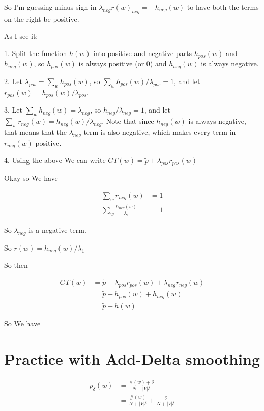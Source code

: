 \documentclass{article}
\begin{document}
		So I'm guessing minus sign in $\lambda_{neg} r(w)_{neg} = -h_{neg}(w)$ to have both the terms on the right be positive.
		
		As I see it:
		
		1. Split the function $h(w)$ into positive and negative parts $h_{pos}(w)$ and $h_{neg}(w)$, so $h_{pos}(w)$ is always positive (or 0) and $h_{neg}(w)$ is always negative.
		
		2. Let $\lambda_{pos} = \sum_w h_{pos}(w)$, so $\sum_w h_{pos}(w)/\lambda_{pos} = 1$, and let $r_{pos}(w) = h_{pos}(w)/\lambda_{pos}$.
		
		3. Let $\sum_{w} h_{neg}(w) = \lambda_{neg}$, so $h_{neg}/\lambda_{neg} = 1$, and let $\sum_w r_{neg}(w) = h_{neg}(w)/\lambda_{neg}$. Note that since $h_{neg}(w)$ is always negative, that means that the $\lambda_{neg}$ term is also negative, which makes every term in $r_{neg}(w)$ positive.
		
		4. Using the above We can write $GT(w) = \tilde{p} + \lambda_{pos}r_{pos}(w) - $
		
		
		Okay so We have
		
		\begin{align}
			\sum_w r_{neg}(w) &= 1\\
			\sum_w \frac{h_{neg}(w)}{\lambda_{1}} &= 1
		\end{align}
		
		So $\lambda_{neg}$ is a negative term.
		
		So $r(w) = h_{neg}(w)/\lambda_1$ 
		
		So then
		
		\begin{align}
			GT(w) &= \tilde{p} + \lambda_{pos}r_{pos}(w) + \lambda_{neg}r_{neg}(w)\\
			&= \tilde{p} + h_{pos}(w) + h_{neg}(w)\\
			&= \tilde{p} + h(w)
		\end{align}
		
		So We have 
		
\section{Practice with Add-Delta smoothing}

	\begin{align}
		p_{\delta}(w) &= \frac{\#(w) + \delta}{N + |V|\delta}\\
		&= \frac{\#(w)}{N + |V|\delta} + \frac{\delta}{N + |V|\delta}
	\end{align}
	    
\end{document}
